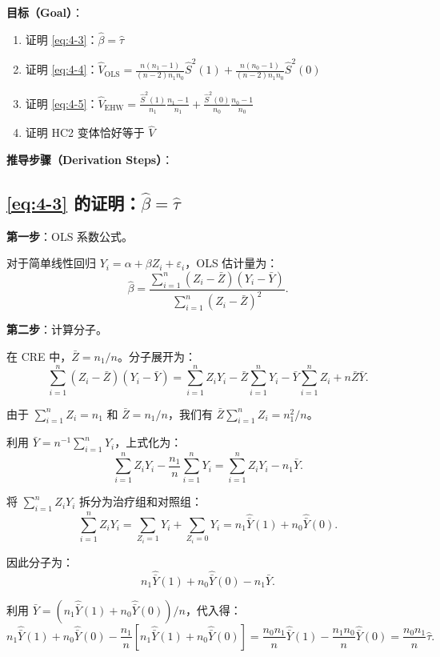 \textbf{目标（Goal）}：
\begin{enumerate}
  \item 证明 \eqref{eq:4-3}：$\hat{\beta} = \hat{\tau}$
  \item 证明 \eqref{eq:4-4}：$\hat{V}_{\text{OLS}} = \frac{n(n_1-1)}{(n-2)n_1 n_0}\hat{S}^2(1) + \frac{n(n_0-1)}{(n-2)n_1 n_0}\hat{S}^2(0)$
  \item 证明 \eqref{eq:4-5}：$\hat{V}_{\text{EHW}} = \frac{\hat{S}^2(1)}{n_1}\frac{n_1-1}{n_1} + \frac{\hat{S}^2(0)}{n_0}\frac{n_0-1}{n_0}$
  \item 证明 HC2 变体恰好等于 $\hat{V}$
\end{enumerate}

\textbf{推导步骤（Derivation Steps）}：

\subsection*{\eqref{eq:4-3} 的证明：$\hat{\beta} = \hat{\tau}$}\label{sec:appendix-ols-proof}

\textbf{第一步}：OLS 系数公式。

对于简单线性回归 $Y_i = \alpha + \beta Z_i + \varepsilon_i$，OLS 估计量为：
\[
\hat{\beta} = \frac{\sum_{i=1}^n (Z_i - \bar{Z})(Y_i - \bar{Y})}{\sum_{i=1}^n (Z_i - \bar{Z})^2}.
\]

\textbf{第二步}：计算分子。

在 CRE 中，$\bar{Z} = n_1/n$。分子展开为：
\[
\sum_{i=1}^n (Z_i - \bar{Z})(Y_i - \bar{Y}) = \sum_{i=1}^n Z_i Y_i - \bar{Z}\sum_{i=1}^n Y_i - \bar{Y}\sum_{i=1}^n Z_i + n\bar{Z}\bar{Y}.
\]

由于 $\sum_{i=1}^n Z_i = n_1$ 和 $\bar{Z} = n_1/n$，我们有 $\bar{Z}\sum_{i=1}^n Z_i = n_1^2/n$。

利用 $\bar{Y} = n^{-1}\sum_{i=1}^n Y_i$，上式化为：
\[
\sum_{i=1}^n Z_i Y_i - \frac{n_1}{n}\sum_{i=1}^n Y_i = \sum_{i=1}^n Z_i Y_i - n_1\bar{Y}.
\]

将 $\sum_{i=1}^n Z_i Y_i$ 拆分为治疗组和对照组：
\[
\sum_{i=1}^n Z_i Y_i = \sum_{Z_i=1} Y_i + \sum_{Z_i=0} Y_i = n_1\hat{\bar{Y}}(1) + n_0\hat{\bar{Y}}(0).
\]

因此分子为：
\[
n_1\hat{\bar{Y}}(1) + n_0\hat{\bar{Y}}(0) - n_1\bar{Y}.
\]

利用 $\bar{Y} = (n_1\hat{\bar{Y}}(1) + n_0\hat{\bar{Y}}(0))/n$，代入得：
\[
n_1\hat{\bar{Y}}(1) + n_0\hat{\bar{Y}}(0) - \frac{n_1}{n}\left[n_1\hat{\bar{Y}}(1) + n_0\hat{\bar{Y}}(0)\right] = \frac{n_0 n_1}{n}\hat{\bar{Y}}(1) - \frac{n_1 n_0}{n}\hat{\bar{Y}}(0) = \frac{n_0 n_1}{n}\hat{\tau}.
\]

